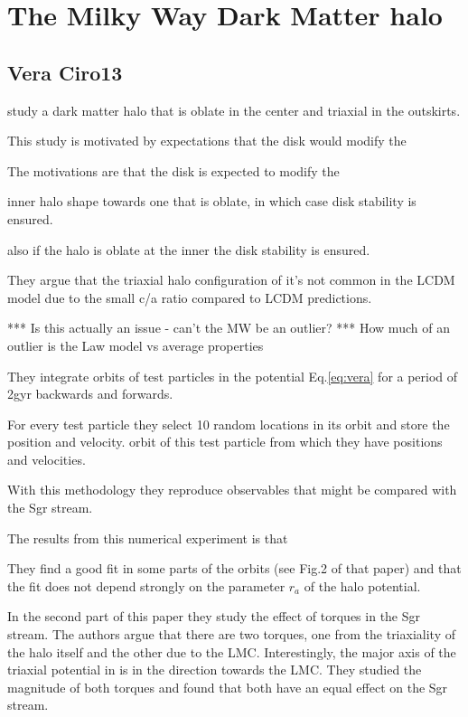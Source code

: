 \documentclass[16pt]{article}
\begin{document}
\section{The Milky Way Dark Matter halo}\label{mw}
\subsection{Vera Ciro13}

\citep{Vera13} study a dark matter halo that is oblate in the center
 and triaxial in the outskirts. 

This study is motivated by expectations that the disk would modify the 

The motivations are that the disk is expected
 to modify the

 inner halo shape towards one that is oblate, in which case disk stability 
is ensured.  

also if the
halo is oblate at the inner the disk stability is ensured. 

They
argue that the triaxial halo configuration of \citep{Law10} it's
not common in the LCDM model due to the small c/a ratio compared to
LCDM predictions.

*** Is this actually an issue - can’t the MW be an outlier?   
***  How much of an outlier is the Law model vs average properties


They integrate orbits of test particles in the potential Eq.\ref{eq:vera} for a period
of 2gyr backwards and forwards. 

For every test particle they select 10 random locations 
in its orbit and store the position and velocity. 
orbit of this test particle from which they have positions and velocities.

 With this methodology they reproduce observables that might be compared with 
the Sgr stream.

The results from this numerical experiment is that 

They find  a good fit in some
parts of the orbits (see Fig.2 of that paper) and that the fit does not depend
strongly on the parameter $r_a$ of the halo potential.

In the second part of this paper they study the effect of torques in the Sgr
stream. The authors argue that there are two torques, one from the triaxiality
of the halo itself and the other due to the LMC. Interestingly, the major
axis of the triaxial potential in \citep{Law10} is in the direction towards
 the LMC. They studied the magnitude of both torques and found that both
have an equal effect on the Sgr stream.
\end{document}
